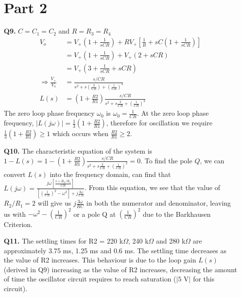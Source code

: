\documentclass[12pt]{article}
\begin{document}
\begin{itemize}
    \section*{Part 2}
    \item [\textbf{Q9.}]
    $C = C_1 = C_2$ and $R = R_3 = R_4$
    \begin{equation*}
    \begin{aligned}
        V_o &= V_+\left(1+\frac{1}{sCR}\right) + RV_+\left[\frac{1}{R} + sC\left(1 + \frac{1}{sCR}\right)\right] \\
        &= V_+\left(1+\frac{1}{sCR}\right) + V_+\left(2 + sCR\right) \\
        &= V_+(3 + \frac{1}{sCR} + sCR) \\
        \Rightarrow \frac{V_+}{V_o} &= \frac{s/CR}{s^2 + s(\frac{3}{CR}) + \left(\frac{1}{CR}\right)^2} \\
        L(s) &= \left(1+\frac{R2}{R1}\right)\frac{s/CR}{s^2 + s\frac{3}{CR} + \left(\frac{1}{CR}\right)^2}
    \end{aligned}
    \end{equation*}
    The zero loop phase frequency $\omega_0$ is $\omega_0 = \frac{1}{CR}$. At the zero loop phase frequency, $\lvert L(j\omega) \rvert = \frac{1}{3}\left(1+\frac{R2}{R1}\right)$, therefore for oscillation we require $\frac{1}{3}\left(1+\frac{R2}{R1}\right) \geq 1$ which occurs when $\frac{R2}{R1} \geq 2$.
    \item [\textbf{Q10.}]
    The characteristic equation of the system is $ 1 - L(s) = 1 - \left(1+\frac{R2}{R1}\right)\frac{s/CR}{s^2 + s\frac{3}{CR} + \left(\frac{1}{CR}\right)^2} = 0$. To find the pole $Q$, we can convert $L(s)$ into the frequency domain, can find that $L(j\omega) = \frac{j\omega\left[\frac{1+R_2/R_1}{CR}\right]}{\left[\left(\frac{1}{CR}\right)^2 - \omega^2\right] + j\frac{3\omega}{CR}}$. From this equation, we see that the value of $R_2/R_1 = 2$ will give us $j\frac{3\omega}{RC}$ in both the numerator and denominator, leaving us with $-\omega^2 - (\frac{1}{CR})^2$ or a pole Q at $(\frac{1}{CR})^2$ due to the Barkhausen Criterion.
    \item [\textbf{Q11.}]
    The settling times for R2 = 220 k$\Omega$, 240 k$\Omega$ and 280 k$\Omega$ are approximately 3.75 ms, 1.25 ms and 0.6 ms. The settling time decreases as the value of R2 increases. This behaviour is due to the loop gain $L(s)$ (derived in Q9) increasing as the value of R2 increases, decreasing the amount of time the oscillator circuit requires to reach saturation ($\lvert5\text{ V}\rvert$ for this circuit).

\end{itemize}
\end{document}
